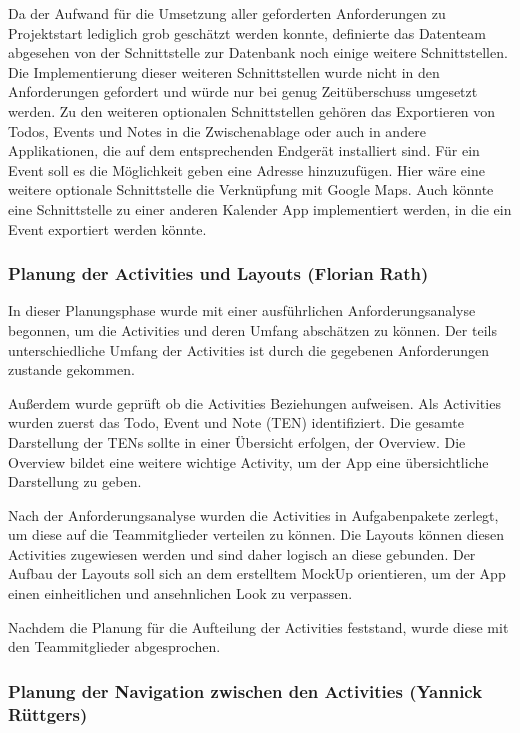 Da der Aufwand für die Umsetzung aller geforderten Anforderungen zu Projektstart lediglich grob geschätzt werden konnte, definierte das Datenteam abgesehen von der Schnittstelle zur Datenbank noch einige weitere Schnittstellen. Die Implementierung dieser weiteren Schnittstellen wurde nicht in den Anforderungen gefordert und würde nur bei genug Zeitüberschuss umgesetzt werden. Zu den weiteren optionalen Schnittstellen gehören das Exportieren von Todos, Events und Notes in die Zwischenablage oder auch in andere Applikationen, die auf dem entsprechenden Endgerät installiert sind. Für ein Event soll es die Möglichkeit geben eine Adresse hinzuzufügen. Hier wäre eine weitere optionale Schnittstelle die Verknüpfung mit Google Maps. Auch könnte eine Schnittstelle zu einer anderen Kalender App implementiert werden, in die ein Event exportiert werden könnte.

\subsubsection{Planung der Activities und Layouts (Florian Rath)}
In dieser Planungsphase wurde mit einer ausführlichen Anforderungsanalyse begonnen, um die Activities und deren Umfang abschätzen zu können. Der teils unterschiedliche Umfang der Activities ist durch die gegebenen Anforderungen zustande gekommen.

Außerdem wurde geprüft ob die Activities Beziehungen aufweisen. Als Activities wurden zuerst das Todo, Event und Note (TEN) identifiziert. Die gesamte Darstellung der TENs sollte in einer Übersicht erfolgen, der Overview. Die Overview bildet eine weitere wichtige Activity, um der App eine übersichtliche Darstellung zu geben.
 
Nach der Anforderungsanalyse wurden die Activities in Aufgabenpakete zerlegt, um diese auf die Teammitglieder verteilen zu können. Die Layouts können diesen Activities zugewiesen werden und sind daher logisch an diese gebunden. Der Aufbau der Layouts soll sich an dem erstelltem MockUp orientieren, um der App einen einheitlichen und ansehnlichen Look zu verpassen.

Nachdem die Planung für die Aufteilung der Activities feststand, wurde diese mit den Teammitglieder abgesprochen. 

\subsubsection{Planung der Navigation zwischen den Activities (Yannick Rüttgers)}

